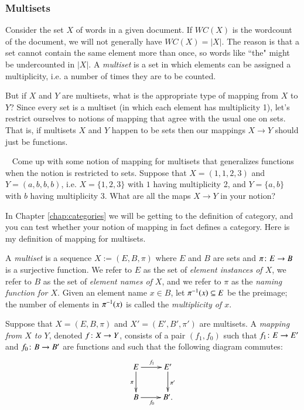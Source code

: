\subsubsection{Multisets}

Consider the set $X$ of words in a given document. If $WC(X)$ is the wordcount of the document, we will not generally have $WC(X)=|X|$. The reason is that a set cannot contain the same element more than once, so words like ``the" might be undercounted in $|X|$. A {\em multiset} is a set in which elements can be assigned a multiplicity, i.e. a number of times they are to be counted. 

But if $X$ and $Y$ are multisets, what is the appropriate type of mapping from $X$ to $Y$? Since every set is a multiset (in which each element has multiplicity 1), let's restrict ourselves to notions of mapping that agree with the usual one on sets. That is, if multisets $X$ and $Y$ happen to be sets then our mappings $X\to Y$ should just be functions.

\begin{exercise}\label{exc:multiset 1}~
\sexc Come up with some notion of mapping for multisets that generalizes functions when the notion is restricted to sets. 
\next Suppose that $X=(1,1,2,3)$ and $Y=(a,b,b,b)$, i.e. $X=\{1,2,3\}$ with $1$ having multiplicity 2, and $Y=\{a,b\}$ with $b$ having multiplicity 3. What are all the maps $X\to Y$ in your notion?
\endsexc
\end{exercise}

In Chapter \ref{chap:categories} we will be getting to the definition of category, and you can test whether your notion of mapping in fact defines a category. Here is my definition of mapping for multisets.

\begin{definition}\label{def:multiset}

A {\em multiset} is a sequence $X:=(E,B,\pi)$ where $E$ and $B$ are sets and $\pi\colon E\rightarrow B$ is a surjective function. We refer to $E$ as the set of {\em element instances of $X$}, we refer to $B$ as the set of {\em element names of $X$}, and we refer to $\pi$ as the {\em naming function for $X$}. Given an element name $x\in B$, let $\pi^\m1(x)\ss E$ be the preimage; the number of elements in $\pi^\m1(x)$ is called the {\em multiplicity of $x$}.

Suppose that $X=(E,B,\pi)$ and $X'=(E',B',\pi')$ are multisets. A {\em mapping from $X$ to $Y$}, denoted $f\colon X\rightarrow Y$, consists of a pair $(f_1,f_0)$ such that $f_1\colon E\rightarrow E'$ and $f_0\colon B\rightarrow B'$ are functions and such that the following diagram commutes:
\begin{align}\label{dia:multiset map}
\xymatrix{E\ar[r]^{f_1}\ar[d]_{\pi}&E'\ar[d]^{\pi'}\\B\ar[r]_{f_0}&B'.}
\end{align}

\end{definition}

